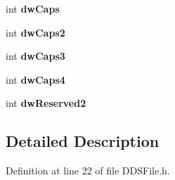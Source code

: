 \begin{DoxyCompactItemize}
\item 
int {\bfseries dw\+Caps}\hypertarget{struct_d_d_s___h_e_a_d_e_r_a72545c3925fdab17734af8849e34006f}{}\label{struct_d_d_s___h_e_a_d_e_r_a72545c3925fdab17734af8849e34006f}

\item 
int {\bfseries dw\+Caps2}\hypertarget{struct_d_d_s___h_e_a_d_e_r_aaa67492946e0226c0d7a9856ff651f2e}{}\label{struct_d_d_s___h_e_a_d_e_r_aaa67492946e0226c0d7a9856ff651f2e}

\item 
int {\bfseries dw\+Caps3}\hypertarget{struct_d_d_s___h_e_a_d_e_r_a5e08cb4b384e154375c41c899b052c42}{}\label{struct_d_d_s___h_e_a_d_e_r_a5e08cb4b384e154375c41c899b052c42}

\item 
int {\bfseries dw\+Caps4}\hypertarget{struct_d_d_s___h_e_a_d_e_r_a8acdd296d7d53d39c989dcb56de783e2}{}\label{struct_d_d_s___h_e_a_d_e_r_a8acdd296d7d53d39c989dcb56de783e2}

\item 
int {\bfseries dw\+Reserved2}\hypertarget{struct_d_d_s___h_e_a_d_e_r_ac5b489890ce6f685967297b18f8c847c}{}\label{struct_d_d_s___h_e_a_d_e_r_ac5b489890ce6f685967297b18f8c847c}

\end{DoxyCompactItemize}


\subsection{Detailed Description}


Definition at line 22 of file D\+D\+S\+File.\+h.

